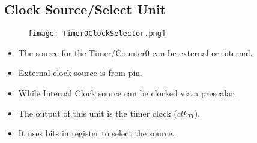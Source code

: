 \documentclass{article}
\begin{document}
\subsection{Clock Source/Select Unit}
\begin{figure}[H]
    \begin{center}
        \texttt{[image: Timer0ClockSelector.png]}
    \end{center}
\end{figure}
\begin{itemize}
    \item The source for the Timer/Counter0 can be external or internal.
    \item External clock source is from  pin.
    \item While Internal Clock source can be clocked via a prescalar.
    \item The output of this unit is the timer clock ($clk_{T1}$).
    \item It uses  bits in  register to select the source.
\end{itemize}
\end{document}
